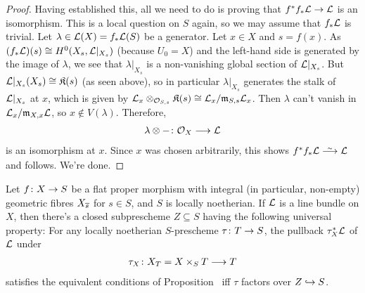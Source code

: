 \documentclass[a4paper,parskip=half,numbers=enddot, DIV=12]{scrreprt}
\begin{document}
\begin{proof}
	Having established this, all we need to do is proving that $f^*f_*\Ll\morphism\Ll$ is an isomorphism. This is a local question on $S$ again, so we may assume that $f_*\mathcal{L}$ is trivial. Let $\lambda\in\mathcal{L}(X)=f_*\mathcal{L}(S)$ 
	be a generator. Let $x\in X$ and $s=f(x)$. As $(f_*\mathcal{L})(s)\cong H^0(X_s,\mathcal{L}|_{X_s})$ (because $U_0=X$) and the left-hand side is generated by the image of $\lambda$, we see that $\lambda|_{X_s}$ is a non-vanishing global section of $\mathcal{L}|_{X_s}$. But $\mathcal{L}|_{X_s}(X_s)\cong \mathfrak{K}(s)$ (as seen above), so in particular $\lambda|_{X_s}$ generates the stalk of $\mathcal{L}|_{X_s}$ at $x$, which is given by $\mathcal{L}_x\otimes_{\mathcal{O}_{S,s}}\mathfrak{K}(s)\cong \mathcal{L}_x/\mathfrak{m}_{S,s}\mathcal{L}_x$. Then $\lambda$ can't vanish in $\mathcal{L}_x/\mathfrak{m}_{X,x}\mathcal{L}$, so $x\notin V(\lambda)$. Therefore,
	\begin{align*}
		\lambda\otimes-\colon \Oo_X\morphism\Ll
	\end{align*}
	is an isomorphism at $x$. Since $x$ was chosen arbitrarily, this shows $f^*f_*\Ll\isomorphism\Ll$ and  follows. We're done.
\end{proof}
\begin{thm}
	Let $f\colon X\morphism S$ be a flat proper morphism with integral (in particular, non-empty) geometric fibres $X_{\overline{s}}$ for $s\in S$, and $S$ is locally noetherian. If $\mathcal{L}$ is a line bundle on $X$, then there's a closed subprescheme $Z\subseteq S$ having the following universal property: For any locally noetherian $S$-prescheme $\tau\colon T\morphism S$, the pullback $\tau_X^*\mathcal{L}$ of $\mathcal{L}$ under
	\begin{align*}
		\tau_X\colon X_T=X\times_ST\morphism T
	\end{align*}
	satisfies the equivalent conditions of Proposition~ iff $\tau$ factors over $Z\monomorphism S$.
\end{thm}
\end{document}
